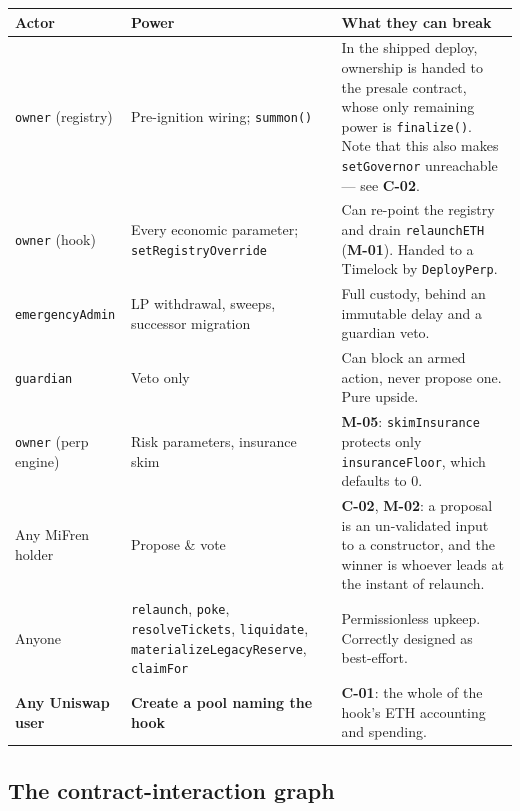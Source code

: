 \documentclass[10pt,a4paper]{article}
\newcommand{\code}[1]{\texttt{\small #1}}
\begin{document}
\begin{center}\small
\begin{tabular}{@{}p{}p{}p{}@{}}
\toprule
\textbf{Actor} & \textbf{Power} & \textbf{What they can break} \\
\midrule
\code{owner} (registry) & Pre-ignition wiring; \code{summon()} & In the shipped deploy, ownership is handed to the presale contract, whose only remaining power is \code{finalize()}. Note that this also makes \code{setGovernor} unreachable --- see \textbf{C-02}. \\
\code{owner} (hook) & Every economic parameter; \code{setRegistryOverride} & Can re-point the registry and drain \code{relaunchETH} (\textbf{M-01}). Handed to a Timelock by \code{DeployPerp}. \\
\code{emergencyAdmin} & LP withdrawal, sweeps, successor migration & Full custody, behind an immutable delay and a guardian veto. \\
\code{guardian} & Veto only & Can block an armed action, never propose one. Pure upside. \\
\code{owner} (perp engine) & Risk parameters, insurance skim & \textbf{M-05}: \code{skimInsurance} protects only \code{insuranceFloor}, which defaults to 0. \\
Any MiFren holder & Propose \& vote & \textbf{C-02}, \textbf{M-02}: a proposal is an un-validated input to a constructor, and the winner is whoever leads at the instant of relaunch. \\
Anyone & \code{relaunch}, \code{poke}, \code{resolveTickets}, \code{liquidate}, \code{materializeLegacyReserve}, \code{claimFor} & Permissionless upkeep. Correctly designed as best-effort. \\
\textbf{Any Uniswap user} & \textbf{Create a pool naming the hook} & \textbf{C-01}: the whole of the hook's ETH accounting and spending. \\
\bottomrule
\end{tabular}
\end{center}

\subsection{The contract-interaction graph}
\label{sec:graph}
\end{document}
